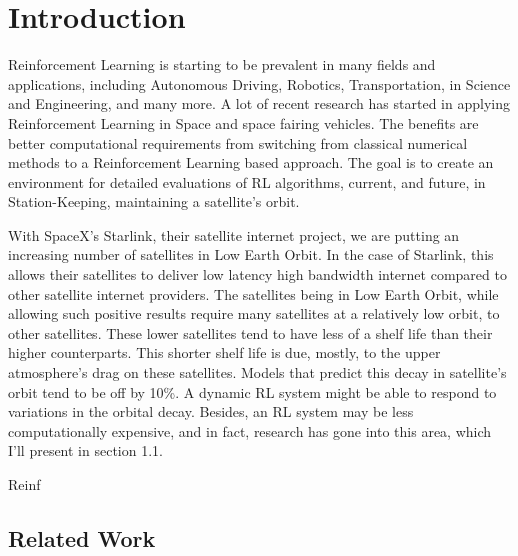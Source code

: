 \chapter{Introduction}\label{ch:intro}

Reinforcement Learning is starting to be prevalent in many fields and applications, including Autonomous Driving, Robotics, Transportation, in Science and Engineering, and many more. A lot of recent research has started in applying Reinforcement Learning in Space and space fairing vehicles. The benefits are better computational requirements from switching from classical numerical methods to a Reinforcement Learning based approach. The goal is to create an environment for detailed evaluations of RL algorithms, current, and future, in Station-Keeping, maintaining a satellite's orbit.

With SpaceX's Starlink, their satellite internet project, we are putting an increasing number of satellites in Low Earth Orbit. In the case of Starlink, this allows their satellites to deliver low latency high bandwidth internet compared to other satellite internet providers. The satellites being in Low Earth Orbit, while allowing such positive results require many satellites at a relatively low orbit, to other satellites. These lower satellites tend to have less of a shelf life than their higher counterparts. This shorter shelf life is due, mostly, to the upper atmosphere's drag on these satellites. Models that predict this decay in satellite's orbit tend to be off by 10\%. A dynamic RL system might be able to respond to variations in the orbital decay. Besides, an RL system may be less computationally expensive, and in fact, research has gone into this area, which I'll present in section 1.1.

Reinf

\section{Related Work}
